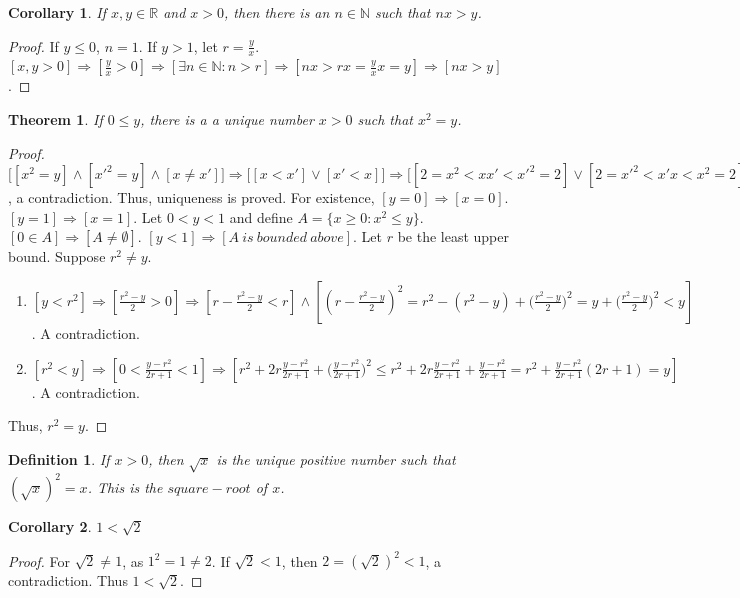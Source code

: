 \documentclass[12pt,oneside]{book}
\theoremstyle{mystyle}
\newtheorem{theorem}{Theorem}[section]
\newtheorem{definition}{Definition}[section]
\newtheorem{corollary}{Corollary}[section]
\begin{document}
\begin{corollary}
If $x,y\in \mathbb{R}$ and $x>0$, then there is an $n\in \mathbb{N}$ such that $nx>y$.
\end{corollary}
\begin{proof}
If $y\leq 0$, $n=1$. If $y>1$, let $r = \frac{y}{x}$. $[x,y>0]\Rightarrow [\frac{y}{x}>0]\Rightarrow [\exists n\in \mathbb{N}:n>r]\Rightarrow [nx > rx = \frac{y}{x}x = y]\Rightarrow[nx>y]$.
\end{proof}

\begin{theorem}
If $0\leq y$, there is a a unique number $x>0$ such that $x^2 = y$.
\end{theorem}
\begin{proof}
$\big[[x^2=y]\land [x'^2=y]\land [x\ne x']\big] \Rightarrow \big[[x<x']\lor[x'<x]\big] \Rightarrow \big[[2=x^2<xx'<x'^2=2]\lor[2=x'^2<x'x<x^2=2]\big]$, a contradiction. Thus, uniqueness is proved. For existence, $[y=0]\Rightarrow[x=0]$.$[y=1]\Rightarrow [x=1]$. Let $0 < y < 1$ and define $A = \{x\geq0:x^2 \leq y\}$. $[0\in A]\Rightarrow[A\ne \emptyset]$. $[y<1]\Rightarrow [A\ is\ bounded\ above]$. Let $r$ be the least upper bound. Suppose $r^2\ne y$.
\begin{enumerate}
\item $[y<r^2]\Rightarrow[\frac{r^2-y}{2}>0]\Rightarrow [r-\frac{r^2-y}{2}<r]\land[(r-\frac{r^2-y}{2})^2= r^2 - (r^2-y)+\big(\frac{r^2-y}{2}\big)^2 = y + \big(\frac{r^2-y}{2}\big)^2 < y]$. A contradiction.
\item $[r^2 <y]\Rightarrow [0<\frac{y-r^2}{2r+1}<1]\Rightarrow [r^2 + 2r\frac{y-r^2}{2r+1}+\big(\frac{y-r^2}{2r+1}\big)^2\leq r^2 + 2r\frac{y-r^2}{2r+1}+\frac{y-r^2}{2r+1} = r^2+\frac{y-r^2}{2r+1}(2r+1)=y]$. A contradiction.
\end{enumerate}
Thus, $r^2 = y$.
\end{proof}

\begin{definition}
If $x>0$, then $\sqrt{x}$ is the unique positive number such that $(\sqrt{x})^2 = x$. This is the $square-root$ of $x$.
\end{definition}

\begin{corollary}
$1<\sqrt{2}$
\end{corollary}
\begin{proof}
For $\sqrt{2} \ne 1$, as $1^2 = 1\ne 2$. If $\sqrt{2}<1$, then $2=(\sqrt{2})^2 <1$, a contradiction. Thus $1<\sqrt{2}$.
\end{proof}
\end{document}

